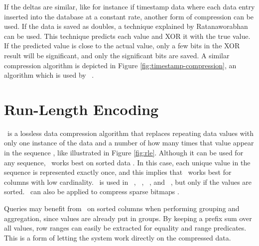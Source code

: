 If the deltas are similar, like for instance if timestamp data where each data entry inserted into the database at a constant rate, another form of compression can be used.  If the data is saved as doubles, a technique explained by Ratanaworabhan \ea~\cite{Ratanaworabhan2006-jb} can be used. This technique predicts each value and XOR it with the true value. If the predicted value is close to the actual value, only a few bits in the XOR result will be significant, and only the significant bits are saved. A similar compression algorithm is depicted in Figure \ref{fig:timestamp-compression}, an algorithm which is used by \gorilla~\cite{Pelkonen2015-ko}.

\section{Run-Length Encoding}
\label{sec:Run-Length Encoding}
\rle~is a lossless data compression algorithm that replaces repeating data values with only one instance of the data and a number of how many times that value appear in the sequence \cite{Stoimen_undated-js}, like illustrated in Figure \ref{fig:rle}. Although it can be used for any sequence, \rle~works best on sorted data \cite{Bjorklund2011-wh, Holloway2008-rr}. In this case, each unique value in the sequence is represented exactly once, and this implies that \rle~works best for columns with low cardinality. \rle~is used in \cstore~\cite{Stonebraker2005-qz}, \vertica~\cite{Lamb2012-kg}, \oracle~\cite{Oracle2015-fs}, and \sapnw~\cite{Lemke2010-is}, but only if the values are sorted. \rle~can also be applied to compress sparse bitmaps \cite{Stonebraker2005-qz}.

Queries may benefit from \rle~on sorted columns when performing grouping and aggregation, since values are already put in groups. By keeping a prefix sum over all values, row ranges can easily be extracted for equality and range predicates. This is a form of letting the system work directly on the compressed data. 


